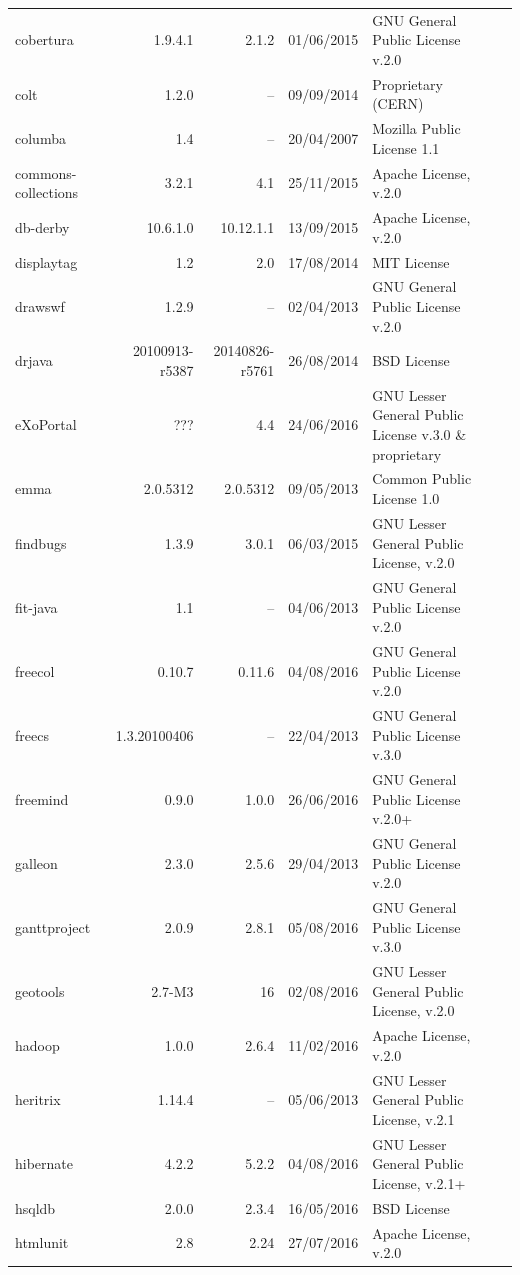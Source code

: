 \documentclass{IEEEtran}
\begin{document}
\begin{table}[H]
\begin{tabular}{l|r|r|c|p{5cm}|p{3cm}}
	cobertura & 1.9.4.1 & 2.1.2 & 01/06/2015 & GNU General Public License v.2.0  \\
	colt & 1.2.0 & -- & 09/09/2014 &  Proprietary (CERN) \\
	columba & 1.4 & -- & 20/04/2007 & Mozilla Public License 1.1  \\
	commons-collections & 3.2.1 & 4.1 & 25/11/2015 & Apache License, v.2.0 \\
	db-derby & 10.6.1.0 & 10.12.1.1 & 13/09/2015 & Apache License, v.2.0 \\
	displaytag & 1.2 & 2.0 & 17/08/2014 & MIT License \\
	drawswf & 1.2.9 & -- & 02/04/2013 & GNU General Public License v.2.0 \\
	drjava & 20100913-r5387 & 20140826-r5761 & 26/08/2014 & BSD License \\
	eXoPortal & ??? & 4.4 & 24/06/2016 & GNU Lesser General Public License v.3.0 \& proprietary \\
	emma & 2.0.5312 & 2.0.5312 & 09/05/2013  & Common Public License 1.0 \\
	findbugs & 1.3.9 & 3.0.1 & 06/03/2015 & GNU Lesser General Public License, v.2.0 \\
	fit-java & 1.1 & -- & 04/06/2013 & GNU General Public License v.2.0 \\
	freecol & 0.10.7 & 0.11.6 & 04/08/2016 & GNU General Public License v.2.0 &  \\
	freecs & 1.3.20100406 & -- & 22/04/2013 & GNU General Public License v.3.0 &   \\
	freemind & 0.9.0 & 1.0.0 & 26/06/2016 & GNU General Public License v.2.0+ &  \\
	galleon & 2.3.0 & 2.5.6 & 29/04/2013 & GNU General Public License v.2.0 \\
	ganttproject & 2.0.9 & 2.8.1 & 05/08/2016 & GNU General Public License v.3.0 &  \\
	geotools & 2.7-M3 & 16 & 02/08/2016 & GNU Lesser General Public License, v.2.0 \\
	hadoop & 1.0.0 & 2.6.4 & 11/02/2016 & Apache License, v.2.0 \\
	heritrix & 1.14.4 & -- & 05/06/2013 & GNU Lesser General Public License, v.2.1 \\
	hibernate & 4.2.2 & 5.2.2 & 04/08/2016 & GNU Lesser General Public License, v.2.1+ \\
	hsqldb & 2.0.0 & 2.3.4 & 16/05/2016 & BSD License \\
	htmlunit & 2.8 & 2.24 & 27/07/2016 & Apache License, v.2.0 \\

\end{tabular}
\end{table}
\end{document}

